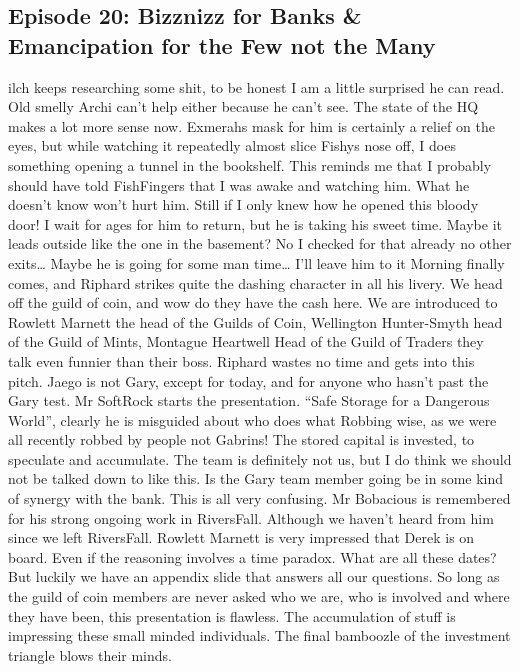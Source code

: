 \subsection{Episode 20: Bizznizz for Banks \& Emancipation for the Few not the Many}
ilch keeps researching some shit, to be honest I am a little surprised he can read. Old smelly Archi can’t help either because he can’t see. The state of the HQ makes a lot more sense now. Exmerahs mask for him is certainly a relief on the eyes, but while watching it repeatedly almost slice Fishys nose off, I does something opening a tunnel in the bookshelf. This reminds me that I probably should have told FishFingers that I was awake and watching him. What he doesn’t know won’t hurt him. Still if I only knew how he opened this bloody door! I wait for ages for him to return, but he is taking his sweet time. Maybe it leads outside like the one in the basement? No I checked for that already no other exits… Maybe he is going for some man time… I’ll leave him to it\medskip
Morning finally comes, and Riphard strikes quite the dashing character in all his livery. We head off the guild of coin, and wow do they have the cash here. We are introduced to Rowlett Marnett the head of the Guilds of Coin, Wellington Hunter-Smyth head of the Guild of Mints, Montague Heartwell Head of the Guild of Traders they talk even funnier than their boss. Riphard wastes no time and gets into this pitch.\medskip
Jaego is not Gary, except for today, and for anyone who hasn’t past the Gary test.\medskip
Mr SoftRock starts the presentation. “Safe Storage for a Dangerous World”, clearly he is misguided about who does what Robbing wise, as we were all recently robbed by people not Gabrins!\medskip
The stored capital is invested, to speculate and accumulate. The team is definitely not us, but I do think we should not be talked down to like this. Is the Gary team member going be in some kind of synergy with the bank. This is all very confusing.\medskip
Mr Bobacious is remembered for his strong ongoing work in RiversFall. Although we haven’t heard from him since we left RiversFall. Rowlett Marnett is very impressed that Derek is on board. Even if the reasoning involves a time paradox. What are all these dates? But luckily we have an appendix slide that answers all our questions.\medskip
So long as the guild of coin members are never asked who we are, who is involved and where they have been, this presentation is flawless.\medskip
The accumulation of stuff is impressing these small minded individuals. The final bamboozle of the investment triangle blows their minds.\medskip
